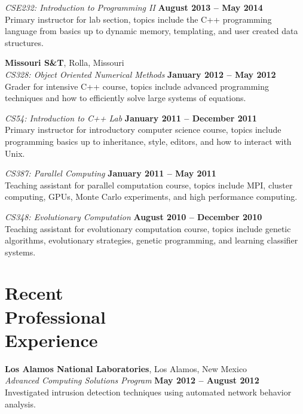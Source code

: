 \documentclass[margin,line]{resume}
\begin{document}
\begin{resume}
    \textsl{CSE232: Introduction to Programming II} \hfill \textbf{August 2013 -- May 2014}\\
    Primary instructor for lab section,
    topics include the C++ programming language from basics up to dynamic memory, templating, and user created data structures.

    \textbf{Missouri S\&T}, Rolla, Missouri \vspace{2mm}\\\vspace{1mm}%
    \textsl{CS328: Object Oriented Numerical Methods} \hfill \textbf{January 2012 -- May 2012}\\
    Grader for intensive C++ course,
    topics include advanced programming techniques and how to efficiently solve large systems of equations.

    \textsl{CS54: Introduction to C++ Lab} \hfill \textbf{January 2011 -- December 2011}\\
    Primary instructor for introductory computer science course,
    topics include programming basics up to inheritance, style, editors, and how to interact with Unix.

    \textsl{CS387: Parallel Computing} \hfill \textbf{January 2011 -- May 2011}\\
    Teaching assistant for parallel computation course,
    topics include MPI, cluster computing, GPUs, Monte Carlo experiments, and high performance computing.
    
    \textsl{CS348: Evolutionary Computation} \hfill \textbf{August 2010 -- December 2010}\\
    Teaching assistant for evolutionary computation course,
    topics include genetic algorithms, evolutionary strategies, genetic programming, and learning classifier systems.

    \section{\mysidestyle Recent\\Professional\\Experience}

    \textbf{Los Alamos National Laboratories}, Los Alamos, New Mexico \vspace{2mm}\\\vspace{1mm}%
    \textsl{Advanced Computing Solutions Program} \hfill \textbf{May 2012 -- August 2012}\\
    Investigated intrusion detection techniques using automated network behavior analysis.
    

\end{resume}
\end{document}

